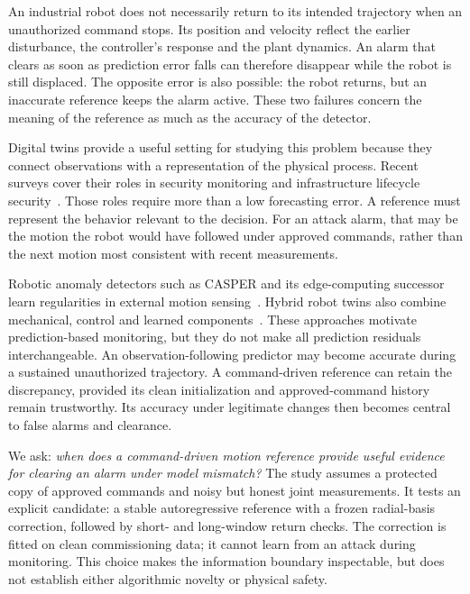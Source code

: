 \documentclass[11pt,twocolumn]{article}
\begin{document}
An industrial robot does not necessarily return to its intended trajectory when an unauthorized command stops. Its position and velocity reflect the earlier disturbance, the controller's response and the plant dynamics. An alarm that clears as soon as prediction error falls can therefore disappear while the robot is still displaced. The opposite error is also possible: the robot returns, but an inaccurate reference keeps the alarm active. These two failures concern the meaning of the reference as much as the accuracy of the detector.

Digital twins provide a useful setting for studying this problem because they connect observations with a representation of the physical process. Recent surveys cover their roles in security monitoring and infrastructure lifecycle security~\cite{securitysurvey,lifecycle}. Those roles require more than a low forecasting error. A reference must represent the behavior relevant to the decision. For an attack alarm, that may be the motion the robot would have followed under approved commands, rather than the next motion most consistent with recent measurements.

Robotic anomaly detectors such as CASPER and its edge-computing successor learn regularities in external motion sensing~\cite{casper,edge}. Hybrid robot twins also combine mechanical, control and learned components~\cite{hybrid}. These approaches motivate prediction-based monitoring, but they do not make all prediction residuals interchangeable. An observation-following predictor may become accurate during a sustained unauthorized trajectory. A command-driven reference can retain the discrepancy, provided its clean initialization and approved-command history remain trustworthy. Its accuracy under legitimate changes then becomes central to false alarms and clearance.

We ask: \emph{when does a command-driven motion reference provide useful evidence for clearing an alarm under model mismatch?} The study assumes a protected copy of approved commands and noisy but honest joint measurements. It tests an explicit candidate: a stable autoregressive reference with a frozen radial-basis correction, followed by short- and long-window return checks. The correction is fitted on clean commissioning data; it cannot learn from an attack during monitoring. This choice makes the information boundary inspectable, but does not establish either algorithmic novelty or physical safety.
\end{document}

